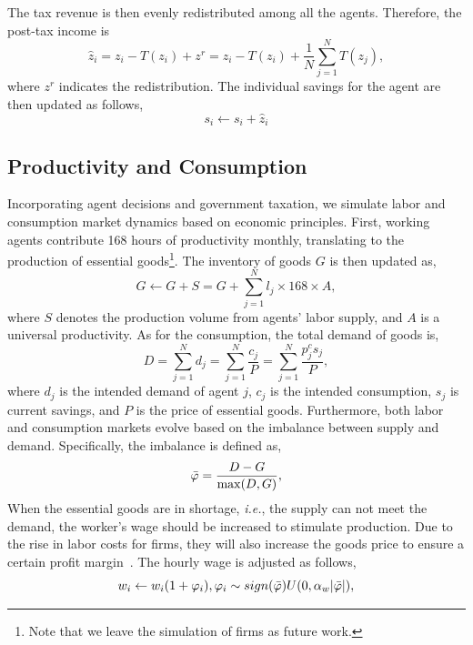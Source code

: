 The tax revenue is then evenly redistributed among all the agents. Therefore, the post-tax income is
\begin{equation}
    \hat{z}_i = z_i - T(z_i) + z^r = z_i - T(z_i) + \frac{1}{N}\sum_{j=1}^N T(z_j),
\end{equation}
where $z^r$ indicates the redistribution. The individual savings for the agent are then updated as follows,
\begin{equation}
    s_i \leftarrow s_i + \hat{z}_i
\end{equation}

\subsection{Productivity and Consumption}
Incorporating agent decisions and government taxation, we simulate labor and consumption market dynamics based on economic principles. First, working agents contribute 168 hours of productivity monthly, translating to the production of essential goods\footnote{Note that we leave the simulation of firms as future work.}. The inventory of goods $G$ is then updated as,
\begin{equation}
    G \leftarrow G + S = G + \sum_{j=1}^N l_j\times 168\times A,
\end{equation}
where $S$ denotes the production volume from agents' labor supply, and $A$ is a universal productivity.
As for the consumption, the total demand of goods is,
\begin{equation}
    D = \sum_{j=1}^N d_j = \sum_{j=1}^N \frac{c_j}{P} = \sum_{j=1}^N \frac{p_j^c s_j}{P},
\end{equation}
where $d_j$ is the intended demand of agent $j$, $c_j$ is the intended consumption, $s_j$ is current savings, and $P$ is the price of essential goods. Furthermore, both labor and consumption markets evolve based on the imbalance between supply and demand. Specifically, the imbalance is defined as,
\begin{equation}
    \Bar{\varphi} = \frac{D - G}{\max(D, G)},
\end{equation}
When the essential goods are in shortage, \textit{i.e.}, the supply can not meet the demand, the worker's wage should be increased to stimulate production. Due to the rise in labor costs for firms, they will also increase the goods price to ensure a certain profit margin~\cite{lengnick2013agent,dawid2018agent,wolf2013multi}. The hourly wage is adjusted as follows,
\begin{equation}
    w_i \leftarrow w_i (1 + \varphi_i), \varphi_i \sim sign(\Bar{\varphi}) U(0, \alpha_w\vert\Bar{\varphi}\vert),
\end{equation}
